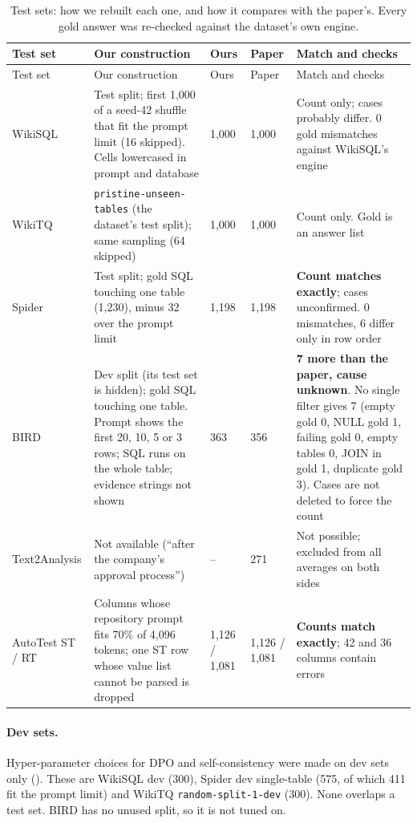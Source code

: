 {\small
{}
\begin{longtable}{@{}p{1.9cm}p{4.0cm}p{1.5cm}p{1.4cm}p{5.5cm}@{}}
\caption{Test sets: how we rebuilt each one, and how it compares with the paper's. Every gold answer was re-checked
against the dataset's own engine.}\label{tab:testsets}\\
\toprule\rowcolor{headshade}Test set & Our construction & Ours & Paper & Match and checks\\\midrule\endfirsthead
\toprule\rowcolor{headshade}Test set & Our construction & Ours & Paper & Match and checks\\\midrule\endhead
\bottomrule\endfoot
WikiSQL~\cite{zhong2017seq2sql,wikisqlrepo} & Test split; first 1,000 of a seed-42 shuffle that fit the prompt limit
(16 skipped). Cells lowercased in prompt and database & 1,000 & 1,000 & Count only; cases probably differ. 0 gold
mismatches against WikiSQL's engine\\
WikiTQ~\cite{pasupat2015wikitq,wikitqrepo} & \texttt{pristine-unseen-tables} (the dataset's test split); same sampling
(64 skipped) & 1,000 & 1,000 & Count only. Gold is an answer list\\
Spider~\cite{yu2018spider} & Test split; gold SQL touching one table (1,230), minus 32 over the prompt limit & 1,198 &
1,198 & \textbf{Count matches exactly}; cases unconfirmed. 0 mismatches, 6 differ only in row order\\
BIRD~\cite{li2023bird} & Dev split (its test set is hidden); gold SQL touching one table. Prompt shows the first 20,
10, 5 or 3 rows; SQL runs on the whole table; evidence strings not shown & 363 & 356 & \textbf{7 more than the paper,
cause unknown}. No single filter gives 7 (empty gold 0, NULL gold 1, failing gold 0, empty tables 0, JOIN in gold 1,
duplicate gold 3). Cases are not deleted to force the count\\
Text2Analysis & Not available (``after the company's approval process'') & -- & 271 & Not possible; excluded from all
averages on both sides\\
AutoTest ST / RT~\cite{autotestrepo} & Columns whose repository prompt fits 70\% of 4,096 tokens; one ST row whose
value list cannot be parsed is dropped & 1,126 / 1,081 & 1,126 / 1,081 & \textbf{Counts match exactly}; 42 and 36
columns contain errors\\
\end{longtable}
}

\paragraph{Dev sets.} Hyper-parameter choices for DPO and self-consistency were made on dev sets only
(). These are WikiSQL dev (300), Spider dev single-table (575, of which 411 fit the prompt limit)
and WikiTQ \texttt{random-split-1-dev} (300). None overlaps a test set. BIRD has no unused split, so it is not tuned on.

